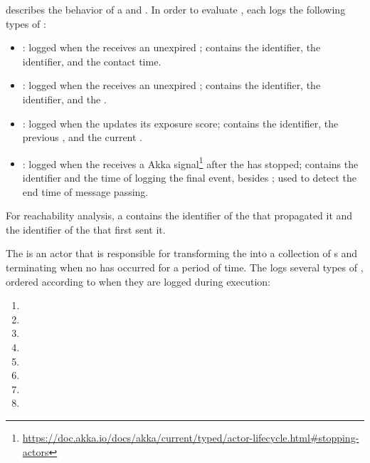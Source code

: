  describes the behavior of a  and . In order to evaluate , each  logs the following types of :
\begin{itemize}
  \item {}: logged when the  receives an unexpired ; contains the  identifier, the  identifier, and the contact time.
  \item {}: logged when the  receives an unexpired ; contains the  identifier, the  identifier, and the .
  \item {}: logged when the  updates its exposure score; contains the  identifier, the previous , and the current .
  \item {}: logged when the  receives a  Akka signal\footnote{\url{https://doc.akka.io/docs/akka/current/typed/actor-lifecycle.html\#stopping-actors}} after the  has stopped; contains the  identifier and the time of logging the final event, besides ; used to detect the end time of message passing.
\end{itemize}
For reachability analysis, a  contains the identifier of the  that propagated it and the identifier of the  that first sent it.

The  is an actor that is responsible for transforming the  into a collection of s and terminating when no  has occurred for a period of time. The  logs several types of , ordered according to when they are logged during execution:

\begin{multicols}{2}
\begin{enumerate}
  \item {}
  \item {}
  \item {}
  \item {}
  \item {}
  \item {}
  \item {}
  \item {}
\end{enumerate}
\end{multicols}

